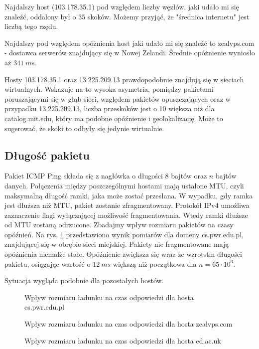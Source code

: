 \documentclass{article}
\begin{document}
    Najdalszy host (103.178.35.1) pod względem liczby węzłów, jaki udało mi się znaleźć, oddalony był o 35 skoków. Możemy przyjąć, że "średnica internetu" jest liczbą tego rzędu. 

    Najdalszy pod względem opóżnienia host jaki udało mi się znaleźć to zealvps.com - dostawca serwerów znajdujący się w Nowej Zelandi. Średnie opóżnienie wyniosło aż $341~ms$.

    Hosty 103.178.35.1 oraz 13.225.209.13 prawdopodobnie znajdują się w sieciach wirtualnych. Wskazuje na to wysoka asymetria, pomiędzy pakietami poruszającymi się w głąb sieci, względem pakietów opuszczających oraz w przypadku 13.225.209.13, liczba przeskoków jest o 10 większa niż dla catalog.mit.edu, który ma podobne opóźnienie i geolokalizację. Może to sugerować, że skoki to odbyły się jedynie wirtualnie.

    \subsection{Długość pakietu}
    Pakiet ICMP Ping składa się z nagłówka o długości 8 bajtów oraz $n$ bajtów danych. Połączenia między poszczególnymi hostami mają ustalone MTU, czyli maksymalną długość ramki, jaka może zostać przesłana. W wypadku, gdy ramka jest dłuższa niż MTU, pakiet zostanie zfragmentowany. Protokół IPv4 umożliwa zaznaczenie flagi wyłączającej możliwość fragmentowania. Wtedy ramki dłuższe od MTU zostaną odrzucone. Zbadajmy wpływ rozmiaru pakietów na czasy opóźnień. Na rys. \ref{fig:cspwr} przedstawiono wynik pomiarów dla domeny cs.pwr.edu.pl, znajdującej się w obrębie sieci miejskiej. Pakiety nie fragmentowane mają opóźnienia niemalże stałe. Opóźnienie zwiększa się wraz ze wzrotstm długości pakietu, osiągając wartość o $12~ms$ większą niż początkowa dla $n=65\cdot10^3$.

    Sytuacja wygląda podobnie dla pozostałych hostów.
    \begin{figure}[h!]
        
        \label{fig:cspwr}
        \caption{Wpływ rozmiaru ładunku na czas odpowiedzi dla hosta cs.pwr.edu.pl}
    \end{figure}

    \begin{figure}[h!]
        
        \caption{Wpływ rozmiaru ładunku na czas odpowiedzi dla hosta zealvps.com}
    \end{figure}

    \begin{figure}[h!]
        
        \caption{Wpływ rozmiaru ładunku na czas odpowiedzi dla hosta ed.ac.uk}
    \end{figure}
\end{document}

